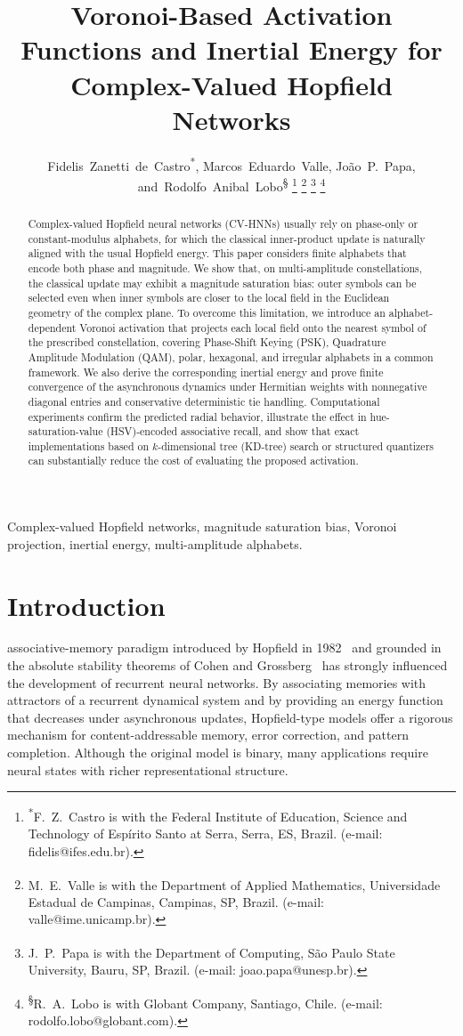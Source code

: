 \documentclass[10pt,journal,letterpaper]{IEEEtran}
\title{Voronoi-Based Activation Functions and Inertial Energy for Complex-Valued Hopfield Networks}
\author{
Fidelis~Zanetti~de~Castro\textsuperscript{*},
Marcos~Eduardo~Valle\textsuperscript{\dag},
João~P.~Papa\textsuperscript{\ddag},
and~Rodolfo~Anibal~Lobo\textsuperscript{\S}
\thanks{\textsuperscript{*}F.~Z.~Castro is with the Federal Institute of Education, 
        Science and Technology of Esp\'irito Santo at Serra, 
        Serra, ES, Brazil. (e-mail: fidelis@ifes.edu.br).}
\thanks{\textsuperscript{\dag}M.~E.~Valle is with the Department of Applied Mathematics, 
        Universidade Estadual de Campinas, 
        Campinas, SP, Brazil. (e-mail: valle@ime.unicamp.br).}
\thanks{\textsuperscript{\ddag}J.~P.~Papa is with the Department of Computing, 
        S\~ao Paulo State University, Bauru, SP, Brazil. (e-mail: joao.papa@unesp.br).}
\thanks{\textsuperscript{\S}R.~A.~Lobo is with Globant Company, 
        Santiago, Chile. (e-mail: rodolfo.\allowbreak{}lobo@\allowbreak{}globant.com).}
}
\begin{document}
\raggedbottom

\maketitle

\begin{abstract}
Complex-valued Hopfield neural networks (CV-HNNs) usually rely on phase-only or constant-modulus alphabets, for which the classical inner-product update is naturally aligned with the usual Hopfield energy. This paper considers finite alphabets that encode both phase and magnitude. We show that, on multi-amplitude constellations, the classical update may exhibit a magnitude saturation bias: outer symbols can be selected even when inner symbols are closer to the local field in the Euclidean geometry of the complex plane. To overcome this limitation, we introduce an alphabet-dependent Voronoi activation that projects each local field onto the nearest symbol of the prescribed constellation, covering Phase-Shift Keying (PSK), Quadrature Amplitude Modulation (QAM), polar, hexagonal, and irregular alphabets in a common framework. We also derive the corresponding inertial energy and prove finite convergence of the asynchronous dynamics under Hermitian weights with nonnegative diagonal entries and conservative deterministic tie handling. Computational experiments confirm the predicted radial behavior, illustrate the effect in hue-saturation-value (HSV)-encoded associative recall, and show that exact implementations based on $k$-dimensional tree (KD-tree) search or structured quantizers can substantially reduce the cost of evaluating the proposed activation.
\end{abstract}

\begin{IEEEkeywords}
Complex-valued Hopfield networks, magnitude saturation bias, Voronoi projection, 
inertial energy, multi-amplitude alphabets.
\end{IEEEkeywords}

\section{Introduction}

 associative-memory paradigm introduced by Hopfield in 1982~\cite{hopfield1982} and grounded in the absolute stability theorems of Cohen and Grossberg~\cite{cohen1983} has strongly influenced the development of recurrent neural networks. By associating memories with attractors of a recurrent dynamical system and by providing an energy function that decreases under asynchronous updates, Hopfield-type models offer a rigorous mechanism for content-addressable memory, error correction, and pattern completion. Although the original model is binary, many applications require neural states with richer representational structure.
\end{document}
